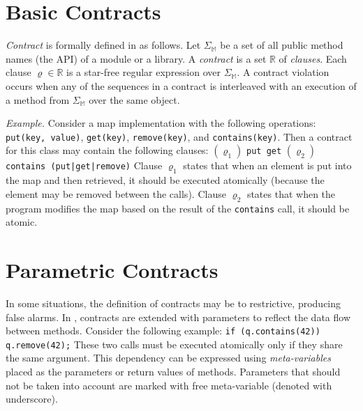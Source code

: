 \section{Basic Contracts}

\emph{Contract} is formally defined in \cite{FITPUB10817} as follows. Let
$\Sigma_\mathbb{M}$ be a set of all public method names (the API) of a module or
a library. A \emph{contract} is a set $\mathbb{R}$ of \emph{clauses}. Each
clause $\varrho \in \mathbb{R}$ is a star-free regular expression over
$\Sigma_\mathbb{M}$. A contract violation occurs when any of the sequences in a
contract is interleaved with an execution of a method from $\Sigma_\mathbb{M}$
over the same object.

\emph{Example.} Consider a map implementation with the following operations:
\texttt{put(key, value)}, \texttt{get(key)}, \texttt{remove(key)}, and
\texttt{contains(key)}. Then a contract for this class may contain the following
clauses:  \newline
    $(\varrho_1)$ \texttt{put get} \newline
    $(\varrho_2)$ \texttt{contains (put|get|remove)} \newline
Clause $\varrho_1$ states that when an element is put into the map and then
retrieved, it should be executed atomically (because the element may be removed
between the calls). Clause $\varrho_2$ states that when the program modifies the
map based on the result of the \texttt{contains} call, it should be atomic.



\section{Parametric Contracts}

In some situations, the definition of contracts may be to restrictive, producing
false alarms. In \cite{FITPUB11510}, contracts are extended with parameters to
reflect the data flow between methods. Consider the following example:
\newline
\texttt{if (q.contains(42)) q.remove(42);} \newline
These two calls must be executed atomically only if they share the same
argument. This dependency can be expressed using \emph{meta-variables} placed as
the parameters or return values of methods. Parameters that should not be taken
into account are marked with free meta-variable (denoted with underscore).

